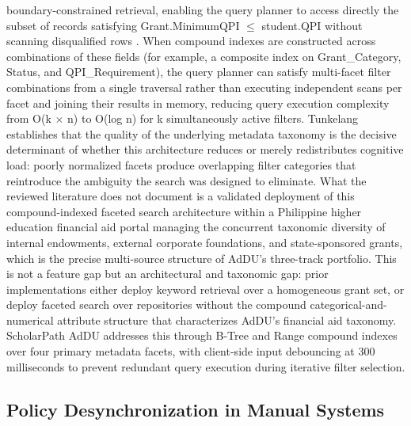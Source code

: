 boundary-constrained retrieval, enabling the query planner to access directly the subset of records satisfying Grant.MinimumQPI $\leq$ student.QPI without scanning disqualified rows \cite{ref36}. When compound indexes are constructed across combinations of these fields (for example, a composite index on Grant\_Category, Status, and QPI\_Requirement), the query planner can satisfy multi-facet filter combinations from a single traversal rather than executing independent scans per facet and joining their results in memory, reducing query execution complexity from O(k $\times$ n) to O(log n) for k simultaneously active filters. Tunkelang \cite{ref43} establishes that the quality of the underlying metadata taxonomy is the decisive determinant of whether this architecture reduces or merely redistributes cognitive load: poorly normalized facets produce overlapping filter categories that reintroduce the ambiguity the search was designed to eliminate. What the reviewed literature does not document is a validated deployment of this compound-indexed faceted search architecture within a Philippine higher education financial aid portal managing the concurrent taxonomic diversity of internal endowments, external corporate foundations, and state-sponsored grants, which is the precise multi-source structure of AdDU's three-track portfolio. This is not a feature gap but an architectural and taxonomic gap: prior implementations either deploy keyword retrieval over a homogeneous grant set, or deploy faceted search over repositories without the compound categorical-and-numerical attribute structure that characterizes AdDU's financial aid taxonomy. ScholarPath AdDU addresses this through B-Tree and Range compound indexes over four primary metadata facets, with client-side input debouncing at 300 milliseconds to prevent redundant query execution during iterative filter selection.

\subsection{Policy Desynchronization in Manual Systems}


